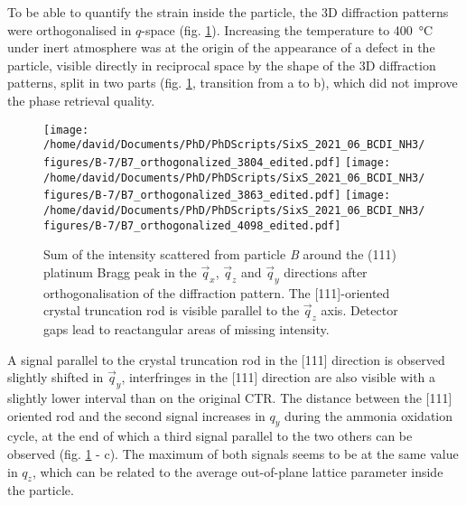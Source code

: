 To be able to quantify the strain inside the particle, the 3D diffraction patterns were orthogonalised in $q$-space (fig. \ref{fig:B7Ortho}).
Increasing the temperature to \qty{400}{\degreeCelsius} under inert atmosphere was at the origin of the appearance of a defect in the particle, visible directly in reciprocal space by the shape of the 3D diffraction patterns, split in two parts (fig. \ref{fig:B7Ortho}, transition from a to b), which did not improve the phase retrieval quality.

\begin{figure}[!htb]
    \centering
    \texttt{[image: /home/david/Documents/PhD/PhDScripts/SixS\_2021\_06\_BCDI\_NH3/figures/B-7/B7\_orthogonalized\_3804\_edited.pdf]}
    \texttt{[image: /home/david/Documents/PhD/PhDScripts/SixS\_2021\_06\_BCDI\_NH3/figures/B-7/B7\_orthogonalized\_3863\_edited.pdf]}
    \texttt{[image: /home/david/Documents/PhD/PhDScripts/SixS\_2021\_06\_BCDI\_NH3/figures/B-7/B7\_orthogonalized\_4098\_edited.pdf]}
    \caption{
        Sum of the intensity scattered from particle \textit{B} around the (111) platinum Bragg peak in the $\vec{q}_x$, $\vec{q}_z$ and $\vec{q}_y$ directions after orthogonalisation of the diffraction pattern.
        The [111]-oriented crystal truncation rod is visible parallel to the $\vec{q}_z$ axis.
        Detector gaps lead to reactangular areas of missing intensity.
    }
    \label{fig:B7Ortho}
\end{figure}

A signal parallel to the crystal truncation rod in the [111] direction is observed slightly shifted in $\vec{q}_y$, interfringes in the [111] direction are also visible with a slightly lower interval than on the original CTR.
The distance between the [111] oriented rod and the second signal increases in $q_y$ during the ammonia oxidation cycle, at the end of which a third signal parallel to the two others can be observed (fig. \ref{fig:B7Ortho} - c).
The maximum of both signals seems to be at the same value in $q_z$, which can be related to the average out-of-plane lattice parameter inside the particle.

